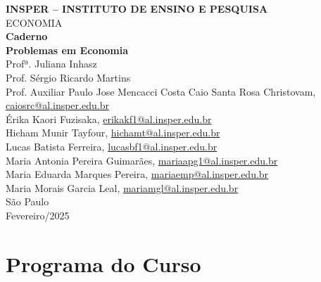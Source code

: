 \documentclass[a4paper,12pt]{article}[abnt2]
\begin{document}
\begin{titlepage}
    \centering
    \vspace*{1cm}
    \Large\textbf{INSPER – INSTITUTO DE ENSINO E PESQUISA}\\
    \Large ECONOMIA\\
    \vspace{1.5cm}
    \Large\textbf{Caderno}\\
    \textbf{Problemas em Economia}\\
    \vspace{1.5cm}
    Profª. Juliana Inhasz  \\
    Prof.  Sérgio Ricardo Martins \\
    Prof. Auxiliar Paulo Jose Mencacci Costa
    \vfill
    \normalsize
    Caio Santa Rosa Christovam, \href{mailto:caiosrc@al.insper.edu.br}{caiosrc@al.insper.edu.br}\\
    Érika Kaori Fuzisaka, \href{mailto:erikakf1@al.insper.edu.br}{erikakf1@al.insper.edu.br}\\
    Hicham Munir Tayfour, \href{mailto:hichamt@al.insper.edu.br}{hichamt@al.insper.edu.br}\\
    Lucas Batista Ferreira, \href{mailto:lucasbf1@al.insper.edu.br}{lucasbf1@al.insper.edu.br}\\
    Maria Antonia Pereira Guimarães, \href{mailto:mariaapg1@al.insper.edu.br}{mariaapg1@al.insper.edu.br}\\
    Maria Eduarda Marques Pereira, \href{mailto:mariaemp@al.insper.edu.br}{mariaemp@al.insper.edu.br}\\
    Maria Morais Garcia Leal, \href{mailto:mariamgl@al.insper.edu.br}{mariamgl@al.insper.edu.br}\\

    \vfill
    São Paulo\\
    Fevereiro/2025
\end{titlepage}
\newpage
\tableofcontents
\thispagestyle{empty} %

\newpage 
\listoffigures
\thispagestyle{empty} %

\newpage
\listoftables
\thispagestyle{empty} %

\newpage
\setcounter{page}{1} %
\justify
\onehalfspacing


\section*{\textbf{Programa do Curso}}
\end{document}
